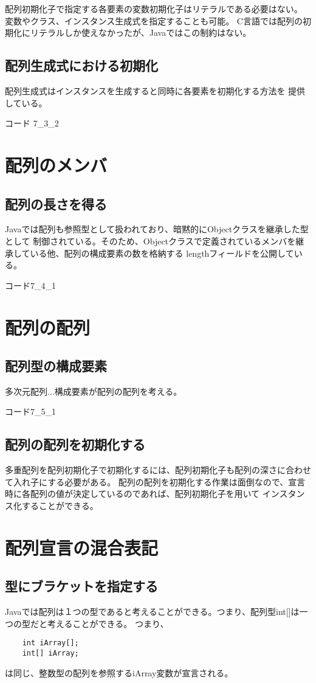 \documentclass[12pt,a4j,twoside]{jsbook}
\begin{document}
配列初期化子で指定する各要素の変数初期化子はリテラルである必要はない。
変数やクラス、インスタンス生成式を指定することも可能。
C言語では配列の初期化にリテラルしか使えなかったが、Javaではこの制約はない。

\subsection{配列生成式における初期化}
配列生成式はインスタンスを生成すると同時に各要素を初期化する方法を
提供している。

コード 7\_3\_2

\section{配列のメンバ}
\subsection{配列の長さを得る}
Javaでは配列も参照型として扱われており、暗黙的にObjectクラスを継承した型として
制御されている。そのため、Objectクラスで定義されているメンバを継承している他、配列の構成要素の数を格納する
lengthフィールドを公開している。

コード7\_4\_1

\section{配列の配列}
\subsection{配列型の構成要素}
多次元配列...構成要素が配列の配列を考える。

コード7\_5\_1

\subsection{配列の配列を初期化する}
多重配列を配列初期化子で初期化するには、配列初期化子も配列の深さに合わせて入れ子にする必要がある。
配列の配列を初期化する作業は面倒なので、宣言時に各配列の値が決定しているのであれば、配列初期化子を用いて
インスタンス化することができる。

\section{配列宣言の混合表記}
\subsection{型にブラケットを指定する}
Javaでは配列は１つの型であると考えることができる。つまり、配列型int[]は一つの型だと考えることができる。
つまり、
\begin{lstlisting}
    int iArray[];
    int[] iArray;
\end{lstlisting}
は同じ、整数型の配列を参照するiArray変数が宣言される。
\end{document}

